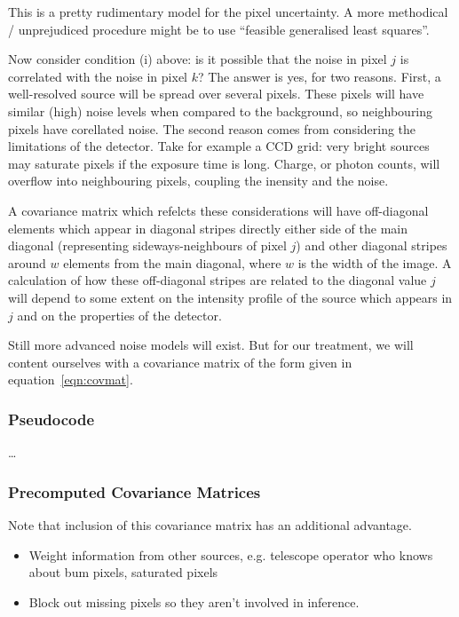 \documentclass[letterpaper, 11pt]{article}
\begin{document}
This is a pretty rudimentary model for the pixel uncertainty. A more methodical / unprejudiced procedure might be to use ``feasible generalised least squares''.

Now consider condition (i) above: is it possible that the noise in pixel $j$ is correlated with the noise in pixel $k$? The answer is yes, for two reasons. First, a well-resolved source will be spread over several pixels. These pixels will have similar (high) noise levels when compared to the background, so neighbouring pixels have corellated noise. The second reason comes from considering the limitations of the detector. Take for example a CCD grid: very bright sources may saturate pixels if the exposure time is long. Charge, or photon counts, will overflow into neighbouring pixels, coupling the inensity and the noise.

A covariance matrix which refelcts these considerations will have off-diagonal elements which appear in diagonal stripes directly either side of the main diagonal (representing sideways-neighbours of pixel $j$) and other diagonal stripes around $w$ elements from the main diagonal, where $w$ is the width of the image. A calculation of how these off-diagonal stripes are related to the diagonal value $j$ will depend to some extent on the intensity profile of the source which appears in $j$ and on the properties of the detector. 

Still more advanced noise models will exist. But for our treatment, we will content ourselves with a covariance matrix of the form given in equation~\ref{eqn:covmat}.



\subsubsection{Pseudocode}

\ldots



\subsubsection{Precomputed Covariance Matrices}

Note that inclusion of this covariance matrix has an additional advantage.
\begin{itemize}
	\item Weight information from other sources, e.g. telescope operator who knows about bum pixels, saturated pixels
	\item Block out missing pixels so they aren't involved in inference.
\end{itemize}
\end{document}
